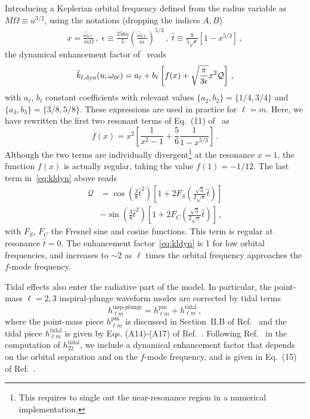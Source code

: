 \documentclass[prd,aps,letter,twocolumn,floatfix,notitlepage,nofootinbib]{revtex4-1}
\newcommand{\be}{\begin{equation}}
\newcommand{\ee}{\end{equation}}
\begin{document}
Introducing a Keplerian orbital frequency defined from the radius variable as $M\Omega \equiv u^{3/2}$, using the notations (dropping the indices $A,B$)
\begin{subequations}
\begin{align}
	x = \frac{\hat{\omega}_{0\ell}}{m\Omega} \,, \; \epsilon \equiv \frac{256\eta}{5} \left( \frac{\hat{\omega}_{0\ell}}{m} \right)^{5/3} \,, \; \hat{t} \equiv \frac{8}{5\sqrt{\epsilon}} \left[ 1 - x^{5/3} \right] \,,
\end{align}
\end{subequations}
the dynamical enhancement factor  of~\cite{Steinhoff:2016rfi, Dietrich:2017feu} reads
\be\label{eq:kldyn}
	\hat{k}_{\ell, \rm{dyn}}(u; \omega_{0\ell}) = a_{\ell} + b_{\ell} \left[ f(x) +\sqrt{\frac{\pi}{3 \epsilon}} x^{2} \mathcal{Q} \right]\,,
\ee
with $a_{\ell}$, $b_{\ell}$ constant coefficients with relevant values $\{a_{2}, b_{2}\} = \{1/4, 3/4\}$ and $\{a_{3}, b_{3}\} = \{3/8, 5/8\}$. These expressions are used in practice for $\ell= m$. Here, we have rewritten the first two resonant terms of Eq.~(11) of~\cite{Dietrich:2017feu} as
\be\label{eq:deff}
	f(x) = x^{2} \left[ \frac{1}{x^{2} - 1} + \frac{5}{6} \frac{1}{1 - x^{5/3}} \right] \,.
\ee
Although the two terms are individually divergent\footnote{This requires to single out the near-resonance region in a numerical implementation.} at the resonance $x=1$, the function $f(x)$ is actually  regular, taking the value $f(1) = -1/12$. The last term in~\eqref{eq:kldyn} above reads
\begin{align}
	\mathcal{Q} &= \cos\left( \frac{3}{8} \hat{t}^{2} \right) \left[ 1 + 2 F_{S} \left( \frac{\sqrt{3}}{2\sqrt{\pi}} \hat{t} \right) \right] \nonumber\\
	& - \sin\left( \frac{3}{8} \hat{t}^{2} \right) \left[ 1 + 2 F_{C} \left( \frac{\sqrt{3}}{2\sqrt{\pi}} \hat{t} \right) \right] \,,
\end{align}
with $F_{S}$, $F_{C}$ the Fresnel sine and cosine functions. This term is regular at resonance $\hat{t} = 0$. The enhancement factor~\eqref{eq:kldyn} is 1 for low orbital frequencies, and increases to $\sim 2$ as $\ell$ times the orbital frequency approaches the $f$-mode frequency.

Tidal effects also enter the radiative part of the model. In particular, the point-mass $\ell=2,3$ inspiral-plunge waveform modes are corrected by tidal terms
\begin{equation}
h_{\ell m}^{\textrm{insp-plunge}} = h_{\ell m}^{\textrm{pm}} + h_{\ell m}^{\textrm{tidal}}\,,\label{hlminspplunge}
\end{equation} 
where the point-mass piece $h_{\ell m}^{\textrm{pm}}$ is discussed in Section~II.B of Ref.~\cite{Bohe:2016gbl} and the tidal piece $h_{\ell m}^{\textrm{tidal}}$ is given by Eqs. (A14)-(A17) of Ref.~\cite{Damour:2012yf}. Following Ref.~\cite{Dietrich:2017feu} in the computation of $h_{22}^{\textrm{tidal}}$, we include a dynamical enhancement factor that depends on the orbital separation and on the $f$-mode frequency, and is given in Eq.~(15) of Ref.~\cite{Dietrich:2017feu}.
\end{document}
